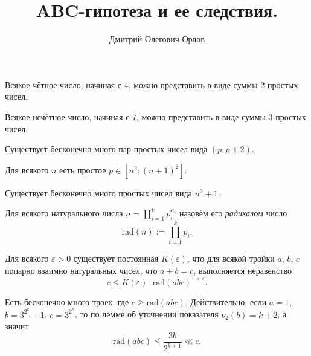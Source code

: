 \documentclass[12pt,a4paper]{article}
\title{ABC-гипотеза и ее следствия.}
\author{Дмитрий Олегович Орлов}
\newcommand{\rad}{\mathrm{rad}}
\begin{document}
    \maketitle

    \begin{statement}
        Всякое чётное число, начиная с $4$, можно представить в виде суммы 2 простых чисел.
    \end{statement}

    \begin{statement}
        Всякое нечётное число, начиная с $7$, можно представить в виде суммы 3 простых чисел.
    \end{statement}
    
    \begin{statement}
        Существует бесконечно много пар простых чисел вида $(p; p+2)$.
    \end{statement}
    
    \begin{statement}[открыта]
        Для всякого $n$ есть простое $p \in [n^2; (n+1)^2]$.
    \end{statement}
    
    \begin{statement}[открыта]
        Существует бесконечно много простых чисел вида $n^2 + 1$.
    \end{statement}

    \begin{definition}
        Для всякого натурального числа $n = \prod_{i=1}^k p_i^{\alpha_i}$ назовём его \emph{радикалом} число
        \[\rad(n) := \prod_{i=1}^k p_i.\]
    \end{definition}
    
    \begin{statement}
        Для всякого $\varepsilon > 0$ существует постоянная $K(\varepsilon)$, что для всякой тройки $a$, $b$, $c$ попарно взаимно натуральных чисел, что $a + b = c$, выполняется неравенство
        \[c \leqslant K(\varepsilon) \cdot \rad(abc)^{1 + \varepsilon}.\]
    \end{statement}

    \begin{example}
        Есть бесконечно много троек, где $c \geqslant \rad(abc)$. Действительно, если $a = 1$, $b = 3^{2^k} - 1$, $c = 3^{2^k}$, то по лемме об уточнении показателя $\nu_2(b) = k+2$, а значит
        \[\rad(abc) \leqslant \frac{3b}{2^{k+1}} \ll c.\]
    \end{example}
\end{document}
